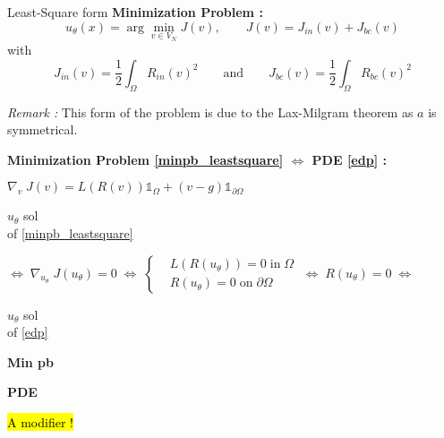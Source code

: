\begin{frame}{Least-Square form}
	\textbf{Minimization Problem :}
	\begin{equation}
		u_\theta(x)=\arg\min_{v\in V_N} J(v), \qquad J(v)=J_{in}(v)+J_{bc}(v)\label{minpb_leastsquare}
	\end{equation}
	with 
	\begin{equation*}
		J_{in}(v)=\frac{1}{2}\int_\Omega R_{in}(v)^2  \qquad \text{and} \qquad J_{bc}(v)=\frac{1}{2}\int_\Omega R_{bc}(v)^2
	\end{equation*}
	
	\footnotesize	
	\textit{Remark :} This form of the problem is due to the Lax-Milgram theorem as $a$ is symmetrical.
	\normalsize
	
	\footnotesize
	\begin{center}
		\begin{tcolorbox}[
			colback=white, %
			colframe=other, %
			arc=2mm, %
			boxrule=0.5pt, %
			breakable, enhanced jigsaw,
			width=\linewidth
			]
			
			\textbf{Minimization Problem \eqref{minpb_leastsquare} $\Leftrightarrow$ PDE \eqref{edp} :}
			
			\centering
			$\nabla_v \; J(v)=L(R(v))\mathds{1}_\Omega+(v-g)\mathds{1}_{\partial\Omega} \qquad $  
			
			\vspace{5pt}
			
			\begin{minipage}{0.1\linewidth}
				\centering
				$u_\theta$ sol \\
				of \eqref{minpb_leastsquare}
			\end{minipage} $\Leftrightarrow \; \nabla_{u_\theta} \; J(u_\theta)=0 \; \Leftrightarrow \; \left\{\begin{aligned}
				&L(R(u_\theta))=0 \; \text{in} \; \Omega \\
				&R(u_\theta)=0 \; \text{on} \; \partial\Omega
			\end{aligned}\right. \; \Leftrightarrow \; R(u_\theta)=0 \; \Leftrightarrow$ \begin{minipage}{0.1\linewidth}
				\centering
				$u_\theta$ sol \\
				of \eqref{edp}
			\end{minipage}
			
			\vspace{5pt}
			
			\begin{minipage}{0.1\linewidth}
				\centering
				\textbf{Min pb}
			\end{minipage} \; \hspace{210pt} \; \begin{minipage}{0.1\linewidth}
				\centering
				\textbf{PDE}
			\end{minipage}
		\end{tcolorbox}
	
		\hl{A modifier !}
	\end{center}
\end{frame}

